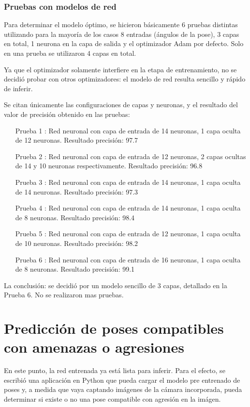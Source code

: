 \documentclass[a4paper,12pt,oneside,spanish]{book}
\begin{document}
\subsubsection{Pruebas con modelos de red}
Para determinar el modelo óptimo, se hicieron básicamente 6 pruebas distintas utilizando para la mayoría de los casos 8 entradas (ángulos de la pose), 3 capas en total, 1 neurona en la capa de salida y el optimizador Adam por defecto. Solo en una prueba se utilizaron 4 capas en total.\par

Ya que el optimizador solamente interfiere en la etapa de entrenamiento, no se decidió probar con otros optimizadores: el modelo de red resulta sencillo y rápido de inferir.\par

Se citan únicamente las configuraciones de capas y neuronas, y el resultado del valor de precisión obtenido en las pruebas:
\begin{enumerate}\baselineskip 16pt	
	\item[Prueba 1]: 
	Red neuronal con capa de entrada de 14 neuronas, 1 capa oculta de 12 neuronas. Resultado precisión: 97.7%
	\item[Prueba 2]: 
	Red neuronal con capa de entrada de 12 neuronas, 2 capas ocultas de 14 y 10 neuronas respectivamente. Resultado precisión: 96.8%
	\item[Prueba 3]: 
	Red neuronal con capa de entrada de 14 neuronas, 1 capa oculta de 14 neuronas. Resultado precisión: 97.3%
	\item[Prueba 4]: 
	Red neuronal con capa de entrada de 14 neuronas, 1 capa oculta de 8 neuronas. Resultado precisión: 98.4%
	\item[Prueba 5]: 
	Red neuronal con capa de entrada de 12 neuronas, 1 capa oculta de 10 neuronas. Resultado precisión: 98.2%
	\item[Prueba 6]: 
	Red neuronal con capa de entrada de 16 neuronas, 1 capa oculta de 8 neuronas. Resultado precisión: 99.1%
\end{enumerate}	\baselineskip 16pt

La conclusión: se decidió por un modelo sencillo de 3 capas, detallado en la Prueba 6. No se realizaron mas pruebas.

\section{Predicción de poses compatibles con amenazas o agresiones}
En este punto, la red entrenada ya está lista para inferir. Para el efecto, se escribió una aplicación en Python que pueda cargar el modelo pre entrenado de poses y, a medida que vaya captando imágenes de la cámara incorporada, pueda determinar si existe o no una pose compatible con agresión en la imágen.\par
\end{document}

